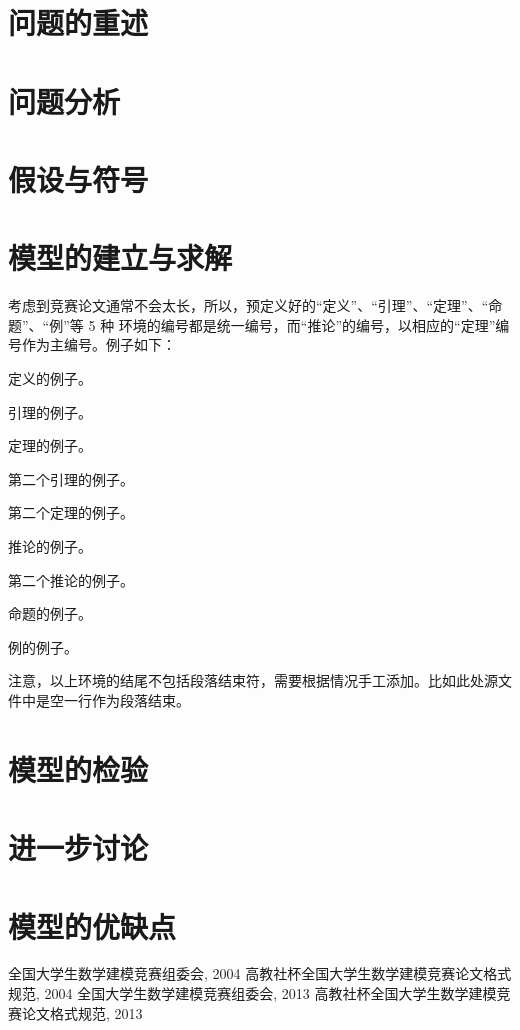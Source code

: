 \documentclass{xcumcmart}
\begin{document}
\section{问题的重述}
\section{问题分析}
\section{假设与符号}
\section{模型的建立与求解}
    考虑到竞赛论文通常不会太长，所以，预定义好的“定义”、“引理”、“定理”、“命题”、“例”等 5 种
环境的编号都是统一编号，而“推论”的编号，以相应的“定理”编号作为主编号。例子如下：

\begin{definition}
  定义的例子。
\end{definition}

\begin{lemma}
  引理的例子。
\end{lemma}

\begin{theorem}
  定理的例子。
\end{theorem}

\begin{lemma}
  第二个引理的例子。
\end{lemma}

\begin{theorem}
  第二个定理的例子。
\end{theorem}

\begin{corollary}
  推论的例子。
\end{corollary}

\begin{corollary}
  第二个推论的例子。
\end{corollary}

\begin{proposition}
  命题的例子。
\end{proposition}

\begin{example}
  例的例子。
\end{example}

    注意，以上环境的结尾不包括段落结束符，需要根据情况手工添加。比如此处源文件中是空一行作为段落结束。
\section{模型的检验}
\section{进一步讨论}
\section{模型的优缺点}

\begin{thebibliography}{1}
 全国大学生数学建模竞赛组委会, 2004 高教社杯全国大学生数学建模竞赛论文格式规范, 2004
 全国大学生数学建模竞赛组委会, 2013 高教社杯全国大学生数学建模竞赛论文格式规范, 2013
\end{thebibliography}
\end{document}

